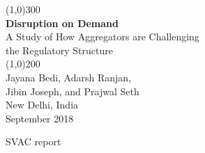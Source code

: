 \documentclass[a4paper, 12pt, twoside]{article}
\begin{document}
                    

\newpage
{}

\begin{titlepage}
\begin{center}
\line(1,0){300}\\
[0.25in]
\huge{\bfseries \textcolor{CCSbrown} {Disruption on Demand}} \\
[0.5cm]
\large{A Study of How Aggregators are Challenging \\ the Regulatory Structure} \\
    	
\line(1,0){200}\\
[3in]
\LARGE{Jayana Bedi, Adarsh Ranjan, \\ Jibin Joseph, and Prajwal Seth} \\ 
[1.5cm]
{\normalsize New Delhi, India} \\
{\normalsize September 2018} \\
[1.85cm]

\end{center}
\end{titlepage}




SVAC report
\end{document}
